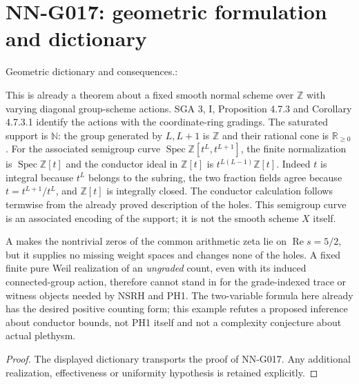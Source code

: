 \section{NN-G017: geometric formulation and dictionary}
\begin{geometricstatement}[NN-G017]
Geometric dictionary and consequences.:

This is already a theorem about a fixed smooth normal scheme
over $\mathbb Z$ with varying diagonal group-scheme actions.
SGA 3, I, Proposition 4.7.3 and Corollary 4.7.3.1 identify
the actions with the coordinate-ring gradings. The saturated
support is $\mathbb N$: the group generated by $L,L+1$ is
$\mathbb Z$ and their rational cone is $\mathbb R_{\ge0}$.
For the associated semigroup curve
$\operatorname{Spec}\mathbb Z[t^L,t^{L+1}]$, the finite
normalization is $\operatorname{Spec}\mathbb Z[t]$ and the
conductor ideal in $\mathbb Z[t]$ is
$t^{L(L-1)}\mathbb Z[t]$. Indeed $t$ is integral because
$t^L$ belongs to the subring, the two fraction fields agree
because $t=t^{L+1}/t^L$, and $\mathbb Z[t]$ is integrally
closed. The conductor calculation follows termwise from the
already proved description of the holes. This semigroup
curve is an associated encoding of the support; it is not
the smooth scheme $X$ itself.

A makes the nontrivial zeros of the common arithmetic zeta
lie on $\operatorname{Re}s=5/2$, but it supplies no missing
weight spaces and changes none of the holes. A fixed finite
pure Weil realization of an \emph{ungraded} count, even with
its induced connected-group action, therefore cannot stand
in for the grade-indexed trace or witness objects needed by
NSRH and PH1. The two-variable formula here already has
the desired positive counting form; this example refutes a
proposed inference about conductor bounds, not PH1 itself
and not a complexity conjecture about actual plethysm.


\end{geometricstatement}
\begin{proof} The displayed dictionary transports the proof of NN-G017. Any additional realization, effectiveness or uniformity hypothesis is retained explicitly.\end{proof}



